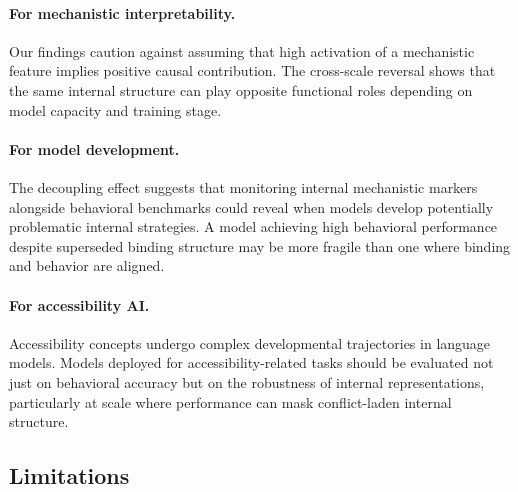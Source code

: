 \documentclass[10pt]{article} %
\begin{document}
\paragraph{For mechanistic interpretability.}
Our findings caution against assuming that high activation of a mechanistic feature implies positive causal contribution.
The cross-scale reversal shows that the same internal structure can play opposite functional roles depending on model capacity and training stage.

\paragraph{For model development.}
The decoupling effect suggests that monitoring internal mechanistic markers alongside behavioral benchmarks could reveal when models develop potentially problematic internal strategies.
A model achieving high behavioral performance despite superseded binding structure may be more fragile than one where binding and behavior are aligned.

\paragraph{For accessibility AI.}
Accessibility concepts undergo complex developmental trajectories in language models.
Models deployed for accessibility-related tasks should be evaluated not just on behavioral accuracy but on the robustness of internal representations, particularly at scale where performance can mask conflict-laden internal structure.

\subsection{Limitations}
\end{document}
